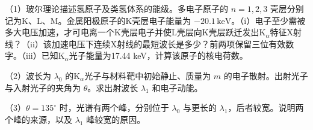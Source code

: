 \documentclass[12pt,a4paper,fontset=fandol]{ctexart}
\begin{document}
（1）玻尔理论描述氢原子及类氢体系的能级。多电子原子的 \(n=1,2,3\)
壳层分别记为K、L、M。金属阳极原子的K壳层电子能量为
\(-20.1\,\mathrm{keV}\)。（i）电子至少需被多大电压加速，才可电离一个K壳层电子并使L壳层向K壳层跃迁发出K\(_\alpha\)特征X射线？（ii）该加速电压下连续X射线的最短波长是多少？前两项保留三位有效数字。（iii）已知K\(_\alpha\)光子能量为17.44
keV，计算该原子的核电荷数。

（2）波长为 \(\lambda_0\) 的K\(_\alpha\)光子与材料靶中初始静止、质量为
\(m\) 的电子散射。出射光子与入射光子的夹角为 \(\theta\)。求出射波长
\(\lambda_1\) 和电子动能。

（3）\(\theta=135^\circ\) 时，光谱有两个峰，分别位于 \(\lambda_0\)
与更长的 \(\lambda_1\)，后者较宽。说明两个峰的来源，以及 \(\lambda_1\)
峰较宽的原因。

\begin{center}
\begin{minipage}{\linewidth}
\centering\begingroup{}
\ifdim\wd\diagrambox>.88\linewidth
\sbox{\diagrambox}{\resizebox{.88\linewidth}{!}{\usebox{\diagrambox}}}\fi
\ifdim\ht\diagrambox>.38\textheight
\resizebox{!}{.38\textheight}{\usebox{\diagrambox}}
\else\usebox{\diagrambox}\fi
\par{}\endgroup\end{minipage}\end{center}
\end{document}
